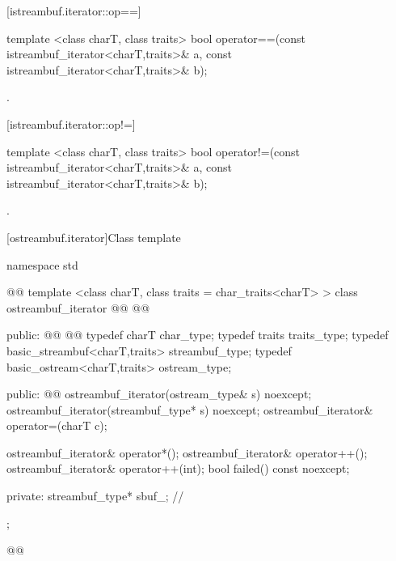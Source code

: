 [istreambuf.iterator::op==]{}

%
\begin{itemdecl}
template <class charT, class traits>
  bool operator==(const istreambuf_iterator<charT,traits>& a,
                  const istreambuf_iterator<charT,traits>& b);
\end{itemdecl}

\begin{itemdescr}
\pnum
\returns
{}.
\end{itemdescr}

[istreambuf.iterator::op!=]{}

%
\begin{itemdecl}
template <class charT, class traits>
  bool operator!=(const istreambuf_iterator<charT,traits>& a,
                  const istreambuf_iterator<charT,traits>& b);
\end{itemdecl}

\begin{itemdescr}
\pnum
\returns
{}.
\end{itemdescr}

[ostreambuf.iterator]{Class template }

%
\begin{codeblock}
namespace std { @@
  template <class charT, class traits = char_traits<charT> >
  class ostreambuf_iterator @\removed{:}@
    @@ {
  public:
    @@
    @@
    typedef charT                         char_type;
    typedef traits                        traits_type;
    typedef basic_streambuf<charT,traits> streambuf_type;
    typedef basic_ostream<charT,traits>   ostream_type;

  public:
    @@
    ostreambuf_iterator(ostream_type& s) noexcept;
    ostreambuf_iterator(streambuf_type* s) noexcept;
    ostreambuf_iterator& operator=(charT c);

    ostreambuf_iterator& operator*();
    ostreambuf_iterator& operator++();
    ostreambuf_iterator& operator++(int);
    bool failed() const noexcept;

  private:
    streambuf_type* sbuf_;                // \expos
  };
}@\newtxt{\}\}\}}@
\end{codeblock}

